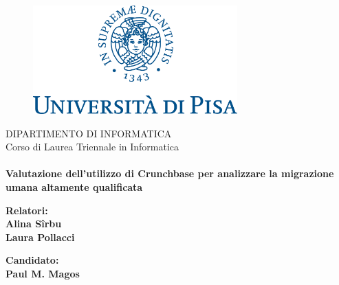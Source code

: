 
\begin{titlepage} %
\begin{figure}[t] %
    \centering\includegraphics[width=0.7\textwidth]{images/Frontespizio/marchio_unipi_pant541.png}
\end{figure}


\begin{Large}
 \begin{center}
    \vspace{25mm}
	{DIPARTIMENTO DI INFORMATICA}\\
	\vspace{3mm}
	{Corso di Laurea Triennale in Informatica\\}
	\vspace{10mm}
    \\
	\vspace{10mm}
	{\Large{\bf Valutazione dell'utilizzo di Crunchbase per analizzare la migrazione umana altamente qualificata}}\\
\end{center}
\end{Large}


\vspace{12mm}
\begin{minipage}[t]{0.47\textwidth}
	{\large{\bf Relatori:\\ Alina Sîrbu \\ Laura Pollacci}}
\end{minipage}
\hfill
\begin{minipage}[t]{0.47\textwidth}\raggedleft
	{\large{\bf Candidato:\\ Paul M. Magos }}
\end{minipage}

\vspace{25mm}

\hrulefill

\vspace{5mm}


\end{titlepage}